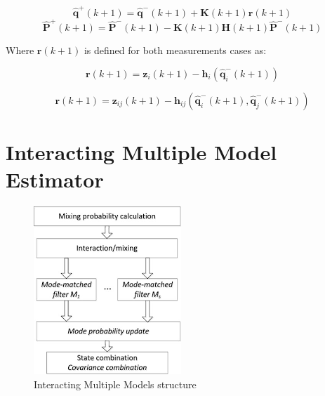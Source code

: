 \documentclass[conference]{IEEEtran}
\begin{document}
$$ \mathbf{\hat{q}^{+}}(k+1) = \mathbf{\hat{q}^{-}}(k+1) + \mathbf{K}(k+1)\mathbf{r}(k+1) $$
$$\mathbf{ \hat{P}^{+}}(k+1) = \mathbf{\hat{P}^{-}}(k+1) -  \mathbf{K}(k+1)\mathbf{H}(k+1) \mathbf{\hat{P}^{-}}(k+1) $$

Where $ \mathbf{r}(k+1) $ is defined for both measurements cases as:

$$\mathbf{r}(k+1)  = \mathbf{z}_{i}(k+1) -  \mathbf{h}_{i}(\mathbf{\hat{q}}_{i}^{-}(k+1))$$

$$\mathbf{r}(k+1)  =   \mathbf{z}_{ij}(k+1) -   \mathbf{h}_{ij}(\mathbf{\hat{q}}_{i}^{-}(k+1), \mathbf{\hat{q}}_{j}^{-}(k+1))$$




\section{Interacting Multiple Model Estimator}

\begin{figure}[H]
 \includegraphics[width=\linewidth]{dwg/imm.png}
  \caption{Interacting Multiple Models structure} 
\end{figure}
\end{document}

